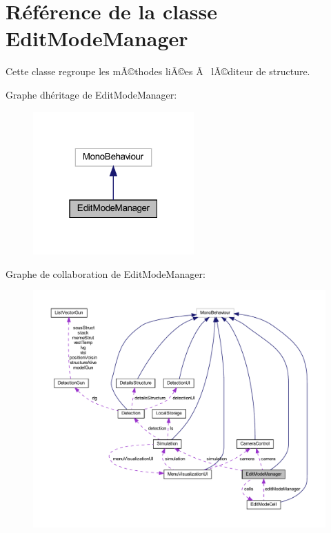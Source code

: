 \hypertarget{class_edit_mode_manager}{}\section{Référence de la classe Edit\+Mode\+Manager}
\label{class_edit_mode_manager}


Cette classe regroupe les mÃ©thodes liÃ©es Ã  l\textquotesingle{}Ã©diteur de structure.  




Graphe d\textquotesingle{}héritage de Edit\+Mode\+Manager\+:\nopagebreak
\begin{figure}[H]
\begin{center}
\leavevmode
\includegraphics[width=175pt]{class_edit_mode_manager__inherit__graph}
\end{center}
\end{figure}


Graphe de collaboration de Edit\+Mode\+Manager\+:
\nopagebreak
\begin{figure}[H]
\begin{center}
\leavevmode
\includegraphics[width=350pt]{class_edit_mode_manager__coll__graph}
\end{center}
\end{figure}
